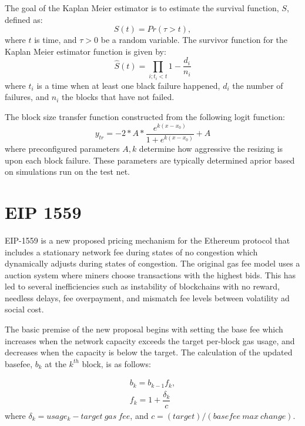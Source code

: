 \documentclass[peerreview]{ieeesyscoin}
\begin{document}
The goal of the Kaplan Meier estimator is to estimate the survival function, $S$, defined as:
\begin{equation}
S(t) = Pr(\tau > t),
\end{equation}
where $t$ is time, and  $\tau > 0$ be a random variable. The survivor function for the Kaplan Meier estimator function is given by:
\begin{equation}
\hat{S}(t) = \prod_{i; t_{i} < t} 1- \frac{d_{i}}{n_{i}}
\end{equation}
where $t_{i}$ is a time when at least one black failure happened, $d_{i}$ the number of failures, and $n_{i}$ the blocks that have not failed. 

The block size transfer function constructed from the following logit function:
\begin{equation}
y_{tr} = -2*A*\frac{e^{k(x-x_{0})}}{1+e^{k(x-x_{0})}} + A
\end{equation}
where preconfigured parameters ${A,k}$  determine how aggressive the resizing is upon each block failure. These parameters are typically determined aprior based on simulations run on the test net. 

\section{EIP 1559}

EIP-1559 is a new proposed pricing mechanism for the Ethereum protocol that includes a stationary network fee during states of no congestion which dynamically adjusts during states of congestion. The original gas fee model uses a auction system where miners choose transactions with the highest bids. This has led to several inefficiencies such as instability of blockchains with no reward, needless delays, fee overpayment, and mismatch fee levels between volatility ad social cost.

The basic premise of the new proposal begins with setting the base fee which increases when the network capacity exceeds the target per-block gas usage, and decreases when the capacity is below the target. The calculation of the updated basefee, $b_{k}$ at the $k^{th}$ block,  is as follows:

\begin{eqnarray} \label{eq:eip1559}
b_{k} = b_{k-1} f_{k}, \\
f_{k} = 1 + \dfrac{\delta_{k}}{c}
\end{eqnarray}
where $\delta_{k} = usage_{k} - target~gas~fee$, and $c = (target)/(basefee~max~change)$.
\end{document}
